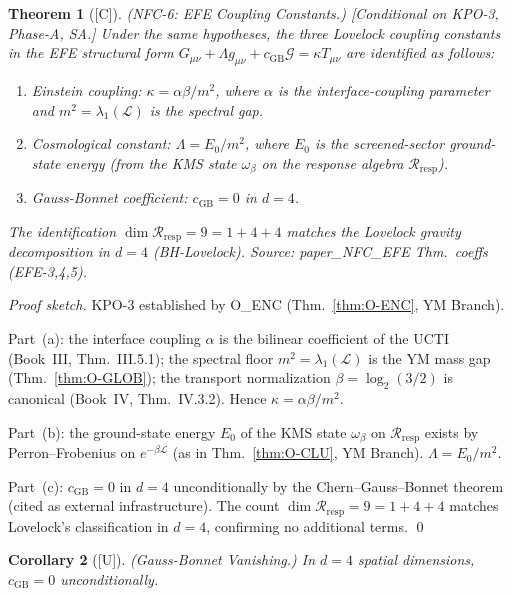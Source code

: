 \documentclass[12pt,oneside]{amsbook}
\theoremstyle{plain}
\newtheorem{theorem}{Theorem}[section]
\newtheorem{corollary}[theorem]{Corollary}
\theoremstyle{definition}
\theoremstyle{remark}
\newcommand{\status}[1]{\textup{[#1]}}
\begin{document}
\begin{theorem}[\status{C}]\label{thm:nfc6}
\textup{(NFC-6: EFE Coupling Constants.)}
\textup{[Conditional on KPO-3, Phase-A, SA.]}
Under the same hypotheses, the three Lovelock coupling constants
in the EFE structural form $G_{\mu\nu} + \Lambda g_{\mu\nu}
+ c_{\mathrm{GB}}\mathcal{G} = \kappa T_{\mu\nu}$ are
identified as follows:
\begin{enumerate}[label=\textup{(\alph*)}]
 \item \emph{Einstein coupling:}
 $\kappa = \alpha\beta/m^2$,
 where $\alpha$ is the interface-coupling parameter and
 $m^2 = \lambda_1(\mathcal{L})$ is the spectral gap.
 \item \emph{Cosmological constant:}
 $\Lambda = E_0/m^2$,
 where $E_0$ is the screened-sector ground-state energy
 (from the KMS state $\omega_\beta$ on the response
 algebra $\mathcal{R}_{\mathrm{resp}}$).
 \item \emph{Gauss-Bonnet coefficient:}
 $c_{\mathrm{GB}} = 0$ in $d = 4$.
\end{enumerate}
The identification $\dim\mathcal{R}_{\mathrm{resp}} = 9 = 1+4+4$
matches the Lovelock gravity decomposition in $d = 4$
(BH-Lovelock).
Source: paper\_NFC\_EFE Thm.~coeffs (EFE-3,4,5).
\end{theorem}

\begin{proof}[Proof sketch]
KPO-3 established by O\_ENC (Thm.~\ref{thm:O-ENC}, YM Branch).

Part~(a): the interface coupling $\alpha$ is the bilinear coefficient
of the UCTI (Book~III, Thm.~III.5.1); the spectral floor
$m^2=\lambda_1(\mathcal{L})$ is the YM mass gap (Thm.~\ref{thm:O-GLOB});
the transport normalization $\beta=\log_2(3/2)$ is canonical
(Book~IV, Thm.~IV.3.2). Hence $\kappa = \alpha\beta/m^2$.

Part~(b): the ground-state energy $E_0$ of the KMS state
$\omega_\beta$ on $\mathcal{R}_{\mathrm{resp}}$ exists by
Perron--Frobenius on $e^{-\beta\mathcal{L}}$ (as in
Thm.~\ref{thm:O-CLU}, YM Branch). $\Lambda = E_0/m^2$.

Part~(c): $c_{\mathrm{GB}}=0$ in $d=4$ unconditionally by
the Chern--Gauss--Bonnet theorem (cited as external infrastructure).
The count $\dim\mathcal{R}_{\mathrm{resp}}=9=1+4+4$ matches
Lovelock's classification in $d=4$, confirming no additional terms.
\qed
\end{proof}

\begin{corollary}[\status{U}]\label{cor:cgb-zero}
\textup{(Gauss-Bonnet Vanishing.)}
In $d = 4$ spatial dimensions, $c_{\mathrm{GB}} = 0$
unconditionally.
\end{corollary}
\end{document}
